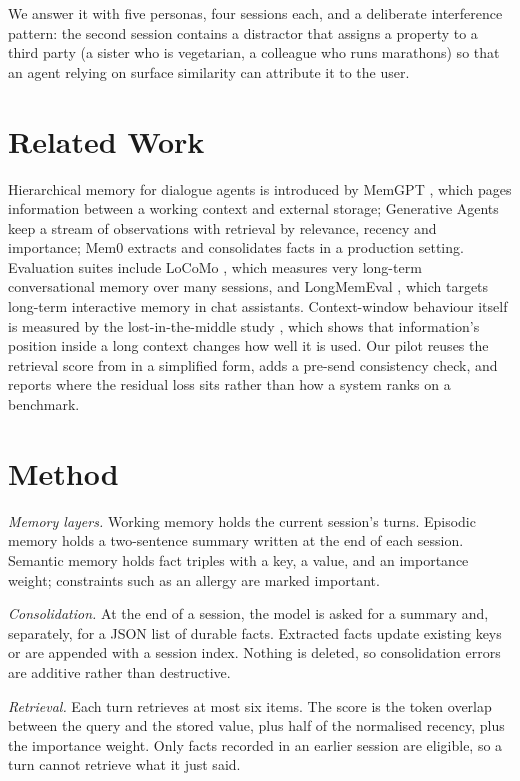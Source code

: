 \documentclass[runningheads,a4paper]{llncs}
\begin{document}
We answer it with five personas, four sessions each, and a deliberate interference pattern: the second session contains a distractor that assigns a property to a third party (a sister who is vegetarian, a colleague who runs marathons) so that an agent relying on surface similarity can attribute it to the user.

\section{Related Work}

Hierarchical memory for dialogue agents is introduced by MemGPT \cite{debenedetti2024agentdojo}, which pages information between a working context and external storage; Generative Agents \cite{struq2024} keep a stream of observations with retrieval by relevance, recency and importance; Mem0 \cite{conformal2021} extracts and consolidates facts in a production setting. Evaluation suites include LoCoMo \cite{acps2026repo}, which measures very long-term conversational memory over many sessions, and LongMemEval \cite{interop2025}, which targets long-term interactive memory in chat assistants. Context-window behaviour itself is measured by the lost-in-the-middle study \cite{camel2025}, which shows that information's position inside a long context changes how well it is used. Our pilot reuses the retrieval score from \cite{struq2024} in a simplified form, adds a pre-send consistency check, and reports where the residual loss sits rather than how a system ranks on a benchmark.

\section{Method}

\emph{Memory layers.} Working memory holds the current session's turns. Episodic memory holds a two-sentence summary written at the end of each session. Semantic memory holds fact triples with a key, a value, and an importance weight; constraints such as an allergy are marked important.

\emph{Consolidation.} At the end of a session, the model is asked for a summary and, separately, for a JSON list of durable facts. Extracted facts update existing keys or are appended with a session index. Nothing is deleted, so consolidation errors are additive rather than destructive.

\emph{Retrieval.} Each turn retrieves at most six items. The score is the token overlap between the query and the stored value, plus half of the normalised recency, plus the importance weight. Only facts recorded in an earlier session are eligible, so a turn cannot retrieve what it just said.
\end{document}
